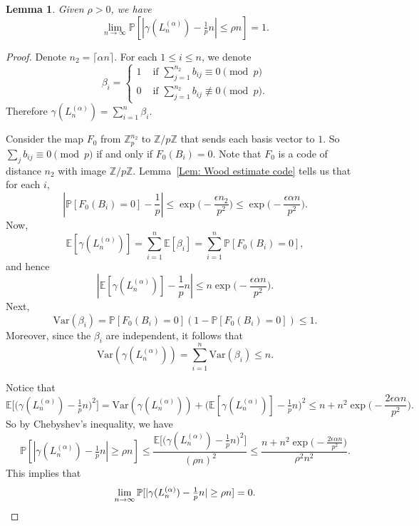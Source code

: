 \documentclass[12pt]{amsart}
\newtheorem{lemma}[theorem]{Lemma}
\theoremstyle{definition}
\newcommand{\PPP}{\mathbb{P}}
\newcommand{\Lna}{L_{n}^{(\alpha)}}
\newcommand{\Var}{\text{Var}}
\newcommand{\Zp}{\Z_p}
\newcommand{\E}{\mathbb{E}}
\newcommand{\Z}{\mathbb{Z}}
\newcommand{\ceil}[1]{\lceil#1\rceil}
\begin{document}
\begin{lemma}\label{Lem: gamma Lna concentrate}
Given $\rho>0$, we have
\[
\lim_{n\to\infty}
\PPP[|\gamma(\Lna)-\tfrac{1}{p} n|\leq \rho n]
=1.
\]
\end{lemma}
\begin{proof}
Denote $n_2=\ceil{\alpha n}$.
For each $1\leq i\leq n$, we denote
\[
\beta_i
=\begin{cases}
    1 &\text{ if } \sum_{j=1}^{n_2} b_{ij}\equiv 0\pmod{p}\\
    0 &\text{ if } \sum_{j=1}^{n_2} b_{ij}\not\equiv 0\pmod{p}.
\end{cases}
\]
Therefore $\gamma(\Lna)=\sum_{i=1}^{n} \beta_i$.

Consider the map $F_0$ from $\Zp^{n_2}$ to $\Z/p\Z$ that sends each basis vector to $1$. So $\sum_{j} b_{ij}\equiv 0\pmod{p}$ if and only if $F_0(B_i)=0$. Note that $F_0$ is a code of distance $n_2$ with image $\Z/p\Z$.
Lemma~\ref{Lem: Wood estimate code} tells us that for each $i$,
\[
\left| \PPP[F_0(B_i)=0]-\frac{1}{p}\right|
\leq \exp\Big(-\frac{\epsilon n_2}{p^2}\Big)
\leq \exp\Big(-\frac{\epsilon \alpha n}{p^2}\Big).
\]
Now,
\[
\E[\gamma(\Lna)]
=\sum_{i=1}^{n} \E[\beta_i]
=\sum_{i=1}^{n} \PPP[F_0(B_i)=0],
\]
and hence
\[
\left| \E[\gamma(\Lna)] 
-\frac{1}{p} n\right|
\leq n \exp\Big(-\frac{\epsilon \alpha n}{p^2}\Big).
\]
Next,
\[
\Var(\beta_i)
= \PPP[F_0(B_i)=0] (1- \PPP[F_0(B_i)=0])
\leq 1.
\]
Moreover, since the $\beta_i$ are independent, it follows that
\[
\Var(\gamma(\Lna))
=\sum_{i=1}^{n} \Var(\beta_i)
\leq n.
\]

Notice that
\[
\E\Big[\big(\gamma(\Lna)-\tfrac{1}{p}n\big)^2\Big]
=\Var(\gamma(\Lna))
+\big(\E[\gamma(\Lna)] -\tfrac{1}{p}n\big)^2
\leq n + n^2 \exp\Big(-\frac{2\epsilon \alpha n}{p^2}\Big).
\]
So by Chebyshev's inequality, we have
\[
\PPP[|\gamma(\Lna)-\tfrac{1}{p} n|\geq \rho n]
\leq \frac{\E\big[\big(\gamma(\Lna)-\tfrac{1}{p}n\big)^2\big]}{(\rho n)^2}
\leq \frac{n + n^2 \exp\Big(-\frac{2\epsilon \alpha n}{p^2}\Big)}{\rho^2 n^2}.
\]
This implies that
\[
\lim_{n\to\infty} \PPP[|\gamma(\Lna)-\tfrac{1}{p} n|\geq \rho n]
=0.\qedhere
\]
\end{proof}
\end{document}
